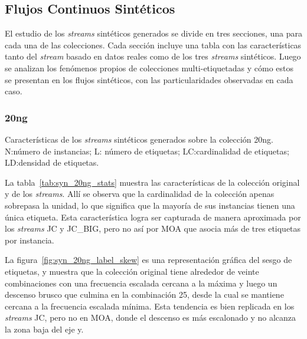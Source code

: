 \subsection{Flujos Continuos Sintéticos}
\label{experimentos_syn_streams}

El estudio de los \textit{streams} sintéticos generados se divide en tres
secciones, una para cada una de las colecciones. Cada sección incluye
una tabla con las características tanto del \textit{stream} basado en datos
reales como de los tres \textit{streams} sintéticos. Luego se analizan los
fenómenos propios de colecciones multi-etiquetadas y cómo estos se presentan en
los flujos sintéticos, con las particularidades observadas en cada caso.

\subsubsection{20ng}

\begin{table}[htbp]
	\centering
	\begin{adjustbox}{max width=\textwidth}
		
	\end{adjustbox}
	\caption[Características de los \textit{streams} sintéticos generados sobre
		la colección 20ng.]{Características de los \textit{streams} sintéticos
		generados sobre la colección 20ng.  N:\@ número de instancias; L:\@
		número de etiquetas; LC:\@ cardinalidad de etiquetas; LD:\@ densidad de
		etiquetas.}
	\label{tab:syn_20ng_stats}
\end{table}
\bigskip

La tabla~\ref{tab:syn_20ng_stats} muestra las características de la colección
original y de los \textit{streams}. Allí se observa que la cardinalidad de la
colección apenas sobrepasa la unidad, lo que significa que la mayoría de sus
instancias tienen una única etiqueta. Esta característica logra ser capturada de
manera aproximada por los \textit{streams} JC y JC\_BIG, pero no así por MOA que
asocia más de tres etiquetas por instancia.

La figura~\ref{fig:syn_20ng_label_skew} es una representación gráfica del sesgo
de etiquetas, y muestra que la colección original tiene alrededor de veinte
combinaciones con una frecuencia escalada cercana a la máxima y luego un
descenso brusco que culmina en la combinación 25, desde la cual se mantiene
cercana a la frecuencia escalada mínima. Esta tendencia es bien replicada en los
\textit{streams} JC, pero no en MOA, donde el descenso es más escalonado y no
alcanza la zona baja del eje y.

